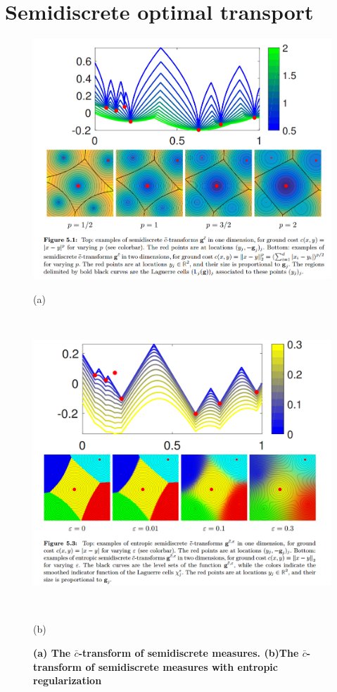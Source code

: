 \documentclass[11pt]{article}
\begin{document}
\section{Semidiscrete optimal transport}
\begin{figure}
\begin{minipage}[t]{1\linewidth}
  \centering
  \centerline{\includegraphics[scale = 0.35]{c_bar_transform_semidiscrete.png}}
    \vspace{-3pt}
  \centerline{(a)}
\end{minipage}\\[-5pt]
\begin{minipage}[t]{1\linewidth}
  \centering
  \centerline{\includegraphics[scale = 0.32]{c_bar_transform_semidiscrete_ent.png}}\
  \vspace{-3pt}
   \centerline{(b)}
\end{minipage}
\caption{\footnotesize{\textbf{(a) The $\bar{c}$-transform of semidiscrete measures. (b)The $\bar{c}$-transform of semidiscrete measures with entropic regularization}}}
\label{fig: c_bar_transform_semidiscrete}
\end{figure}
\end{document}
